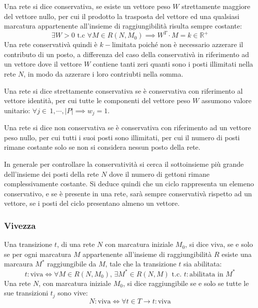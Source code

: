 \documentclass{article}
\numberwithin{equation}{subsection}
\begin{document}
Una rete si dice conservativa, se esiste un vettore peso $W$ strettamente maggiore del vettore nullo, per cui il prodotto la trasposta del vettore ed una qualsiasi marcatura 
appartenente all'insieme di raggiungibilità risulta sempre costante:
\begin{equation*}
    \exists W>0\mbox{ t.c }\forall M\in R(N,M_0)\implies W^T\cdot M=k\in\mathbb{R}^+
\end{equation*}
Una rete conservativà quindi è $k-$limitata poiché non è necessario azzerare il contributo di un posto, a differenza del caso della conservativà in riferimento ad un vettore 
dove il vettore $W$ contiene tanti zeri quanti sono i posti illimitati nella rete $N$, in modo da azzerare i loro contriubti nella somma. 

Una rete si dice strettamente conservativa se è conservativa con riferimento al vettore identità, per cui tutte le componenti del vettore peso $W$ assumono valore unitario: 
$\forall j\in\,1,\cdots,|P|\implies w_j=1$. 


Una rete si dice non conservativa se è conservativa con riferimento ad un vettore peso nullo, per cui tutti i suoi posti sono illimitati, per cui il numero di posti rimane 
costante solo se non si considera nessun posto della rete. 

In generale per controllare la conservatività si cerca il sottoinsieme più grande dell'insieme dei posti della rete $N$ dove il numero di gettoni rimane complessivamente 
costante. Si deduce quindi che un ciclo rappresenta un elemeno conservativo, e se è presente in una rete, sarà sempre conservativà rispetto ad un vettore, se i posti del ciclo 
presentano almeno un vettore. 

\subsubsection{Vivezza}

Una transizione $t$, di una rete $N$ con marcatura iniziale $M_0$, si dice viva, se e solo se per ogni marcatura $M$ appartenente all'insieme di raggiungibilità $R$ esiste una 
marcaura $M^*$ raggiungibile da $M$, tale che la transizione $t$ sia abilitata:
\begin{equation*}
    t:\mbox{viva}\iff \forall M\in R(N,M_0),\,\exists M^*\in R(N,M)\mbox{ t.c. } t:\mbox{abilitata in }M^*
\end{equation*}
Una rete $N$, con marcatura iniziale $M_0$, si dice raggiungibile se e solo se tutte le sue transizioni $t_j$ sono vive:
\begin{equation*}
    N:\mbox{viva}\iff \forall t\in T\to t:\mbox{viva} 
\end{equation*}
\end{document}
